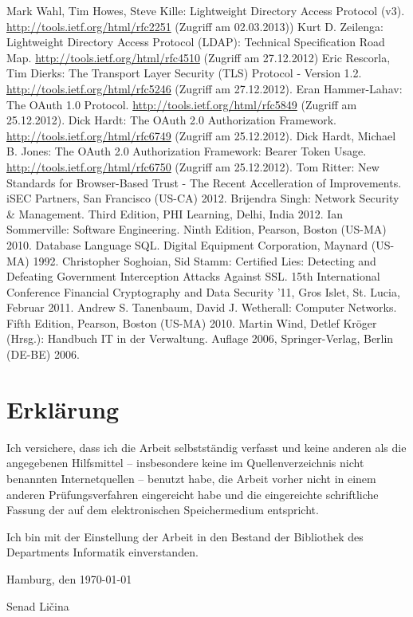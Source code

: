 \documentclass[12pt,a4paper,pointednumbers,abstracton]{scrartcl}
\begin{document}
\begin{raggedright}
\begin{thebibliography}{XXXXXXXX}
	 Mark Wahl, Tim Howes, Steve Kille: Lightweight Directory Access Protocol (v3). \url{http://tools.ietf.org/html/rfc2251} (Zugriff am 02.03.2013))
	 Kurt D. Zeilenga: Lightweight Directory Access Protocol (LDAP): Technical Specification Road Map. \url{http://tools.ietf.org/html/rfc4510} (Zugriff am 27.12.2012)
	 Eric Rescorla, Tim Dierks: The Transport Layer Security (TLS) Protocol - Version 1.2. \url{http://tools.ietf.org/html/rfc5246} (Zugriff am 27.12.2012).
	 Eran Hammer-Lahav: The OAuth 1.0 Protocol. \url{http://tools.ietf.org/html/rfc5849} (Zugriff am 25.12.2012).
	 Dick Hardt: The OAuth 2.0 Authorization Framework. \url{http://tools.ietf.org/html/rfc6749} (Zugriff am 25.12.2012).
	 Dick Hardt, Michael B. Jones: The OAuth 2.0 Authorization Framework: Bearer Token Usage. \url{http://tools.ietf.org/html/rfc6750} (Zugriff am 25.12.2012).
	 Tom Ritter: New Standards for Browser-Based Trust - The Recent Accelleration of Improvements. iSEC Partners, San Francisco (US-CA) 2012.
	 Brijendra Singh: Network Security \& Management. Third Edition, PHI Learning, Delhi, India 2012.
	 Ian Sommerville: Software Engineering. Ninth Edition, Pearson, Boston (US-MA) 2010.
	 Database Language SQL. Digital Equipment Corporation, Maynard (US-MA) 1992.
	 Christopher Soghoian, Sid Stamm: Certified Lies: Detecting and Defeating Government Interception Attacks Against SSL. 15th International Conference Financial Cryptography and Data Security '11, Gros Islet, St. Lucia, Februar 2011.
	 Andrew S. Tanenbaum, David J. Wetherall: Computer Networks. Fifth Edition, Pearson, Boston (US-MA) 2010.
	 Martin Wind, Detlef Kröger (Hrsg.): Handbuch IT in der Verwaltung. Auflage 2006, Springer-Verlag, Berlin (DE-BE) 2006.
\end{thebibliography}
\end{raggedright}


\newpage
{}
\section*{Erklärung}
Ich versichere, dass ich die Arbeit selbstständig verfasst und keine anderen als die angegebenen Hilfsmittel -- insbesondere keine im Quellenverzeichnis nicht benannten Internetquellen -- benutzt habe, die Arbeit vorher nicht in einem anderen Prüfungsverfahren eingereicht habe und die eingereichte schriftliche Fassung der auf dem elektronischen Speichermedium entspricht.

Ich bin mit der Einstellung der Arbeit in den Bestand der Bibliothek des Departments Informatik einverstanden.

Hamburg, den \today

\bigskip
Senad Ličina
\end{document}
